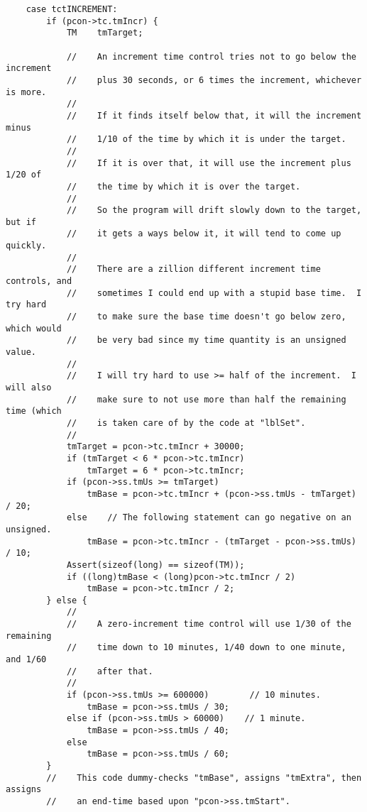 \documentclass[10pt,dvipdfmx,letterpaper]{report}
\begin{document}
{\scriptsize
\begin{verbatim}
    case tctINCREMENT:
        if (pcon->tc.tmIncr) {
            TM    tmTarget;

            //    An increment time control tries not to go below the increment
            //    plus 30 seconds, or 6 times the increment, whichever is more.
            //
            //    If it finds itself below that, it will the increment minus
            //    1/10 of the time by which it is under the target.
            //
            //    If it is over that, it will use the increment plus 1/20 of
            //    the time by which it is over the target.
            //
            //    So the program will drift slowly down to the target, but if
            //    it gets a ways below it, it will tend to come up quickly.
            //
            //    There are a zillion different increment time controls, and
            //    sometimes I could end up with a stupid base time.  I try hard
            //    to make sure the base time doesn't go below zero, which would
            //    be very bad since my time quantity is an unsigned value.
            //
            //    I will try hard to use >= half of the increment.  I will also
            //    make sure to not use more than half the remaining time (which
            //    is taken care of by the code at "lblSet".
            //
            tmTarget = pcon->tc.tmIncr + 30000;
            if (tmTarget < 6 * pcon->tc.tmIncr)
                tmTarget = 6 * pcon->tc.tmIncr;
            if (pcon->ss.tmUs >= tmTarget)
                tmBase = pcon->tc.tmIncr + (pcon->ss.tmUs - tmTarget) / 20;
            else    // The following statement can go negative on an unsigned.
                tmBase = pcon->tc.tmIncr - (tmTarget - pcon->ss.tmUs) / 10;
            Assert(sizeof(long) == sizeof(TM));
            if ((long)tmBase < (long)pcon->tc.tmIncr / 2)
                tmBase = pcon->tc.tmIncr / 2;
        } else {
            //
            //    A zero-increment time control will use 1/30 of the remaining
            //    time down to 10 minutes, 1/40 down to one minute, and 1/60
            //    after that.
            //
            if (pcon->ss.tmUs >= 600000)        // 10 minutes.
                tmBase = pcon->ss.tmUs / 30;
            else if (pcon->ss.tmUs > 60000)    // 1 minute.
                tmBase = pcon->ss.tmUs / 40;
            else
                tmBase = pcon->ss.tmUs / 60;
        }
        //    This code dummy-checks "tmBase", assigns "tmExtra", then assigns
        //    an end-time based upon "pcon->ss.tmStart".

\end{verbatim}}
\end{document}
